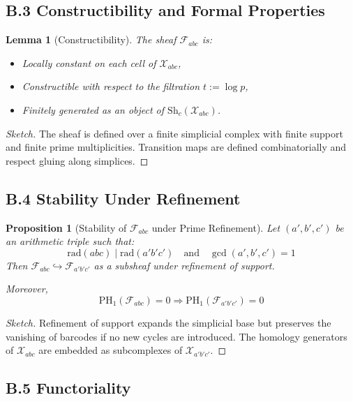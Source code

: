 \documentclass[11pt]{article}
\newtheorem{lemma}[theorem]{Lemma}
\newtheorem{proposition}[theorem]{Proposition}
\begin{document}
\subsection*{B.3 Constructibility and Formal Properties}

\begin{lemma}[Constructibility]
The sheaf \( \mathcal{F}_{abc} \) is:
\begin{itemize}
  \item Locally constant on each cell of \( \mathcal{X}_{abc} \),
  \item Constructible with respect to the filtration \( t := \log p \),
  \item Finitely generated as an object of \( \mathrm{Sh}_c(\mathcal{X}_{abc}) \).
\end{itemize}
\end{lemma}

\begin{proof}[Sketch]
The sheaf is defined over a finite simplicial complex with finite support and finite prime multiplicities.  
Transition maps are defined combinatorially and respect gluing along simplices.
\end{proof}

\subsection*{B.4 Stability Under Refinement}

\begin{proposition}[Stability of \( \mathcal{F}_{abc} \) under Prime Refinement]
Let \( (a',b',c') \) be an arithmetic triple such that:
\[
\mathrm{rad}(abc) \mid \mathrm{rad}(a'b'c') \quad \text{and} \quad \gcd(a',b',c')=1
\]
Then \( \mathcal{F}_{abc} \hookrightarrow \mathcal{F}_{a'b'c'} \) as a subsheaf under refinement of support.

Moreover,
\[
\mathrm{PH}_1(\mathcal{F}_{abc}) = 0 \Rightarrow \mathrm{PH}_1(\mathcal{F}_{a'b'c'}) = 0
\]
\end{proposition}

\begin{proof}[Sketch]
Refinement of support expands the simplicial base but preserves the vanishing of barcodes if no new cycles are introduced.  
The homology generators of \( \mathcal{X}_{abc} \) are embedded as subcomplexes of \( \mathcal{X}_{a'b'c'} \).
\end{proof}

\subsection*{B.5 Functoriality}
\end{document}
